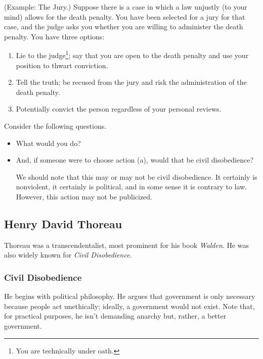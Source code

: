 \documentclass[letterpaper]{article}
\begin{document}
\begin{mdframed}[]
    (Example: The Jury.) Suppose there is a case in which a law unjustly (to your mind) allows for the death penalty. You have been selected for a jury for that case, and the judge asks you whether you are willing to administer the death penalty. You have three options: 
    \begin{enumerate}
        \item Lie to the judge\footnote{You are technically under oath.}; say that you are open to the death penalty and use your position to thwart conviction. 
        \item Tell the truth; be recused from the jury and risk the administration of the death penalty. 
        \item Potentially convict the person regardless of your personal reviews. 
    \end{enumerate}
    Consider the following questions. 
    \begin{itemize}
        \item What would you do?
        \item And, if someone were to choose action (a), would that be civil disobedience?
        
        \bigskip 

        We should note that this may or may not be civil disobedience. It certainly is nonviolent, it certainly is political, and in some sense it is contrary to law. However, this action may not be publicized.
    \end{itemize}
\end{mdframed}

\subsection{Henry David Thoreau}
Thoreau was a transcendentalist, most prominent for his book \emph{Walden}. He was also widely known for \emph{Civil Disobedience}.

\subsubsection{Civil Disobedience}
He begins with political philosophy. He argues that government is only necessary because people act unethically; ideally, a government would not exist. Note that, for practical purposes, he isn't demanding anarchy but, rather, a better government. 

\bigskip 
\end{document}
